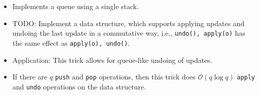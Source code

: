 \begin{itemize}
  \item Implements a queue using a single stack.
	\item TODO: Implement a data structure, which supports applying updates and undoing the last update in a commutative way, i.e., \texttt{undo(), apply(o)} has the same effect as \texttt{apply(o), undo()}.
  \item Application: This trick allows for queue-like undoing of updates.
  \item If there are $q$ \texttt{push} and \texttt{pop} operations, then this trick does $\mathcal{O}(q\log q)$ \texttt{apply} and \texttt{undo} operations on the data structure.
\end{itemize}
